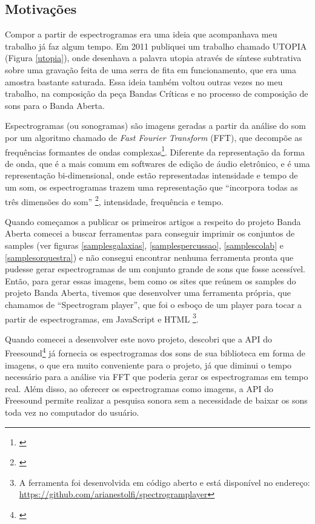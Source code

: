 \subsection{Motivações}

Compor a partir de espectrogramas era uma ideia que acompanhava meu trabalho já faz algum tempo. Em 2011 publiquei um trabalho chamado UTOPIA (Figura \ref{utopia}), onde desenhava a palavra utopia através de síntese subtrativa sobre uma gravação feita de uma serra de fita em funcionamento, que era uma amostra bastante saturada. Essa ideia também voltou outras vezes no meu trabalho, na composição da peça Bandas Críticas e no processo de composição de sons para o Banda Aberta. 

Espectrogramas (ou sonogramas) são imagens geradas a partir da análise do som por um algoritmo chamado de \emph{Fast Fourier Transform} (FFT), que decompõe as frequências formantes de ondas complexas\footnote{\cite[55]{Roads}}. Diferente da representação da forma de onda, que é a mais comum em softwares de edição de áudio eletrônico, e é uma representação bi-dimensional, onde estão representadas intensidade e tempo de um som, os espectrogramas trazem uma representação que ``incorpora todas as três dimensões do som'' \footnote{\cite{Schafer2011}}, intensidade, frequência e tempo. 


Quando começamos a publicar os primeiros artigos a respeito do projeto Banda Aberta comecei a buscar ferramentas para conseguir imprimir os conjuntos de samples (ver figuras \ref{samplesgalaxias}, \ref{samplespercussao}, \ref{samplescolab} e \ref{samplesorquestra}) e não consegui encontrar nenhuma ferramenta pronta que pudesse gerar espectrogramas de um conjunto grande de sons que fosse acessível. Então, para gerar essas imagens, bem como os sites que reúnem os samples do projeto Banda Aberta, tivemos que desenvolver uma ferramenta própria, que chamamos de ``Spectrogram player'', que foi o esboço de um player para tocar a partir de espectrogramas, em JavaScript e HTML \footnote{A ferramenta foi desenvolvida em código aberto e está disponível no endereço: \url{https://github.com/arianestolfi/spectrogramplayer}}. 

Quando comecei a desenvolver este novo projeto, descobri que a API do Freesound\footnote{\cite{Akkermans2011}} já fornecia os espectrogramas dos sons de sua biblioteca em forma de imagens, o que era muito conveniente para o projeto, já que diminui o tempo necessário para a análise via FFT que poderia gerar os espectrogramas em tempo real. Além disso, ao oferecer os espectrogramas como imagens, a API do Freesound permite realizar a pesquisa sonora sem a necessidade de baixar os sons toda vez no computador do usuário.

